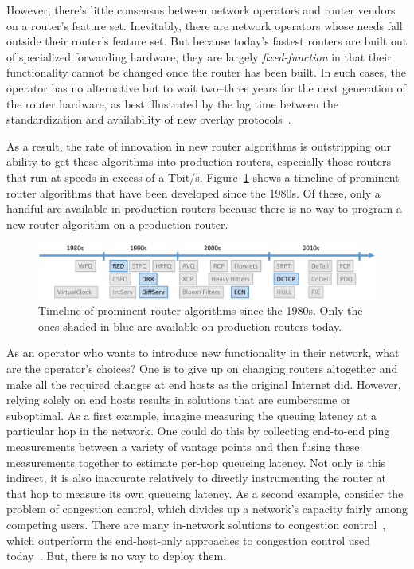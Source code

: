 However, there's little consensus between network operators and router vendors
on a router's feature set. Inevitably, there are network operators whose needs
fall outside their router's feature set. But because today's fastest routers
are built out of specialized forwarding hardware, they are largely {\em
fixed-function} in that their functionality cannot be changed once the router
has been built. In such cases, the operator has no alternative but to wait
two--three years for the next generation of the router hardware, as best
illustrated by the lag time between the standardization and availability of new
overlay protocols~\cite{vxlan, nvgre}.

As a result, the rate of innovation in new router algorithms is outstripping
our ability to get these algorithms into production routers, especially those
routers that run at speeds in excess of a Tbit/s.
Figure~\ref{fig:router_algos} shows a timeline of prominent router algorithms
that have been developed since the 1980s. Of these, only a handful are
available in production routers because there is no way to program a new router
algorithm on a production router.

\begin{figure}
\centering
\includegraphics[width=\columnwidth]{router_alg_timeline.pdf}
\caption{Timeline of prominent router algorithms since the 1980s. Only the ones
shaded in blue are available on production routers today.}
\label{fig:router_algos}
\end{figure}

As an operator who wants to introduce new functionality in their network, what
are the operator's choices? One is to give up on changing routers altogether
and make all the required changes at end hosts as the original Internet did.
However, relying solely on end hosts results in solutions that are cumbersome
or suboptimal. As a first example, imagine measuring the queuing latency at a
particular hop in the network. One could do this by collecting end-to-end ping
measurements between a variety of vantage points and then fusing these
measurements together to estimate per-hop queueing latency. Not only is this
indirect, it is also inaccurate relatively to directly instrumenting the router
at that hop to measure its own queueing latency. As a second example, consider
the problem of congestion control, which divides up a network's capacity fairly
among competing users. There are many in-network solutions to congestion
control~\cite{xcp, rcp}, which outperform the end-host-only approaches to
congestion control used today~\cite{cubic, compound}. But, there is no way to
deploy them. 

